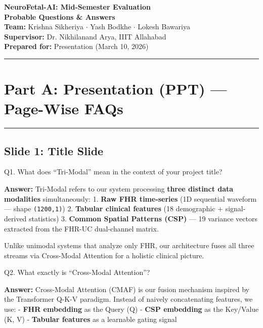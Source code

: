 \documentclass[11pt,a4paper]{article}
\begin{document}
\begin{center}
    {\Huge \textbf{NeuroFetal-AI: Mid-Semester Evaluation}} \\ \vspace{0.5em}
    {\LARGE \textbf{Probable Questions \& Answers}} \\ \vspace{2em}
    {\large \textbf{Team:} Krishna Sikheriya $\cdot$ Yash Bodkhe $\cdot$ Lokesh Bawariya} \\ \vspace{0.5em}
    {\large \textbf{Supervisor:} Dr. Nikhilanand Arya, IIIT Allahabad} \\ \vspace{1em}
    {\large \textbf{Prepared for:} Presentation (March 10, 2026)}
\end{center}
\vspace{1.5em}
\hrule
\vspace{1.5em}
\tableofcontents
\newpage
\section{Part A: Presentation (PPT) --- Page-Wise
FAQs}\label{part-a-presentation-ppt-page-wise-faqs}

\begin{center}\rule{0.5\linewidth}{0.5pt}\end{center}

\subsection{Slide 1: Title Slide}\label{slide-1-title-slide}

\begin{questionbox}
Q1. What does ``Tri-Modal'' mean in the context of your project
title?
\end{questionbox}
\textbf{Answer:} Tri-Modal refers to our system processing \textbf{three
distinct data modalities} simultaneously: 1. \textbf{Raw FHR
time-series} (1D sequential waveform --- shape \texttt{(1200,1)}) 2.
\textbf{Tabular clinical features} (18 demographic + signal-derived
statistics) 3. \textbf{Common Spatial Patterns (CSP)} --- 19 variance
vectors extracted from the FHR-UC dual-channel matrix.

Unlike unimodal systems that analyze only FHR, our architecture fuses
all three streams via Cross-Modal Attention for a holistic clinical
picture.

\begin{questionbox}
Q2. What exactly is ``Cross-Modal Attention''?
\end{questionbox}
\textbf{Answer:} Cross-Modal Attention (CMAF) is our fusion mechanism
inspired by the Transformer Q-K-V paradigm. Instead of naively
concatenating features, we use: - \textbf{FHR embedding} as the Query
(Q) - \textbf{CSP embedding} as the Key/Value (K, V) - \textbf{Tabular
features} as a learnable gating signal
\end{document}
